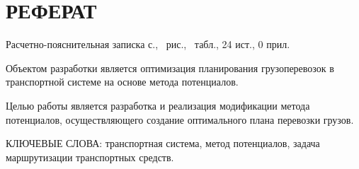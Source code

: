 \section*{РЕФЕРАТ}

Расчетно-пояснительная записка \pageref{LastPage} с., \totalfigures\ рис., \totaltables\ табл., 24 ист., 0 прил.

Объектом разработки является оптимизация планирования грузоперевозок в транспортной системе на основе метода потенциалов.

Целью работы является разработка и реализация модификации метода потенциалов, осуществляющего создание оптимального плана перевозки грузов.

КЛЮЧЕВЫЕ СЛОВА: транспортная система, метод потенциалов, задача маршрутизации транспортных средств.

\pagebreak